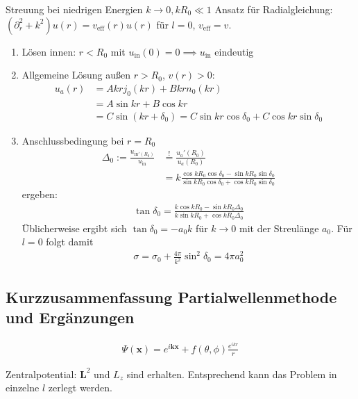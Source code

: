 \documentclass[11pt,a4paper]{report}
\begin{document}
Streuung bei niedrigen Energien $k \rightarrow 0, k R_0 \ll 1$
Ansatz für Radialgleichung: $(\partial_r^2 + k^2) u(r) = v_{\mathrm{eff}}(r) u(r)$ für $l=0$, $v_{\mathrm{eff}} = v$.
\begin{enumerate}
    \item Lösen innen: $r < R_0$ mit $u_{\mathrm{in}}(0) = 0 \implies u_{\mathrm{in}}$ eindeutig 
    \item Allgemeine Lösung außen $r > R_0$, $v(r)>0$:
    \begin{align*}
        u_a(r) &= A k r j_0(k r) + B k r n_0(k r) \\
        &= A \sin k r + B \cos k r \\
        &= C \sin (k r + \delta_0) = C \sin kr \cos \delta_0 + C \cos kr \sin \delta_0
    \end{align*}
    \item Anschlussbedingung bei $r=R_0$
    \begin{align*}
        \Delta_0 := \frac{u_{\mathrm{in}'(R_0)}}{u_{\mathrm{in}}} &\stackrel{!}{=} \frac{u_a'(R_0)}{u_a(R_0)} \\ 
        &= k \frac{\cos k R_0 \cos \delta_0 - \sin k R_0 \sin \delta_0}{\sin k R_0 \cos \delta_0 + \cos k R_0 \sin \delta_0} 
    \end{align*}
    ergeben:
    \begin{align*}
        \tan \delta_0 = \frac{k \cos k R_0 - \sin k R_0 \Delta_0}{k \sin k R_0 + \cos k R_0 \Delta_0}
    \end{align*}
    Üblicherweise ergibt sich $\tan \delta_0 = -a_0 k$ für $k \rightarrow 0$ mit der Streulänge $a_0$.
    Für $l=0$ folgt damit 
    \begin{align*}
        \sigma = \sigma_0 + \frac{4\pi}{k^2} \sin^2 \delta_0 = 4 \pi a_0^2
    \end{align*}
\end{enumerate}

\subsection{Kurzzusammenfassung Partialwellenmethode und Ergänzungen}

\begin{align*}
    \Psi(\mathbf{x}) = e^{i \mathbf{k} \mathbf{x}} + f(\theta, \phi) \frac{e^{i k r}}{r}
\end{align*}

Zentralpotential: $\mathbf{L}^2$ und $L_z$ sind erhalten. 
Entsprechend kann das Problem in einzelne $l$ zerlegt werden.
\end{document}
